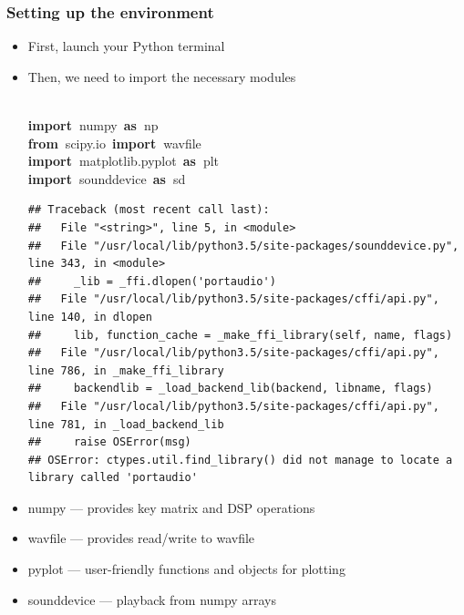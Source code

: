 \documentclass{beamer}\usepackage[]{graphicx}\usepackage[]{color}
\makeatletter
\newcommand{\hlopt}[1]{\textcolor[rgb]{0,0,0}{#1}}%
\newcommand{\hlstd}[1]{\textcolor[rgb]{0.345,0.345,0.345}{#1}}%
\newcommand{\hlkwa}[1]{\textcolor[rgb]{0.161,0.373,0.58}{\textbf{#1}}}%
\newenvironment{kframe}{%
 \def\at@end@of@kframe{}%
 \ifinner\ifhmode%
  \def\at@end@of@kframe{\end{minipage}}%
  \begin{minipage}{\columnwidth}%
 \fi\fi%
 \def\FrameCommand##1{\hskip\@totalleftmargin \hskip-\fboxsep
 \colorbox{shadecolor}{##1}\hskip-\fboxsep
     \hskip-\linewidth \hskip-\@totalleftmargin \hskip\columnwidth}%
 \MakeFramed {\advance\hsize-\width
   \@totalleftmargin\z@ \linewidth\hsize
   \@setminipage}}%
 {\par\unskip\endMakeFramed%
 \at@end@of@kframe}
\newenvironment{knitrout}{}{} %
\makeatother
\begin{document}
\begin{frame}[fragile]
\frametitle{Setting up the environment}
\begin{itemize}
	\item First, launch your Python terminal

	\item Then, we need to import the necessary modules
\begin{knitrout}
\color{fgcolor}\begin{kframe}
\noindent
\ttfamily
\hlstd{}\hspace*{\fill}\\
\hlkwa{import\ }\hlstd{numpy\ }\hlkwa{as\ }\hlstd{np}\hspace*{\fill}\\
\hlkwa{from\ }\hlstd{scipy}\hlopt{.}\hlstd{io\ }\hlkwa{import\ }\hlstd{wavfile}\hspace*{\fill}\\
\hlkwa{import\ }\hlstd{matplotlib}\hlopt{.}\hlstd{pyplot\ }\hlkwa{as\ }\hlstd{plt}\hspace*{\fill}\\
\hlkwa{import\ }\hlstd{sounddevice\ }\hlkwa{as\ }\hlstd{sd}\hspace*{\fill}\\
\hspace*{\fill}
\mbox{}
\normalfont

\begin{verbatim}
## Traceback (most recent call last):
##   File "<string>", line 5, in <module>
##   File "/usr/local/lib/python3.5/site-packages/sounddevice.py", line 343, in <module>
##     _lib = _ffi.dlopen('portaudio')
##   File "/usr/local/lib/python3.5/site-packages/cffi/api.py", line 140, in dlopen
##     lib, function_cache = _make_ffi_library(self, name, flags)
##   File "/usr/local/lib/python3.5/site-packages/cffi/api.py", line 786, in _make_ffi_library
##     backendlib = _load_backend_lib(backend, libname, flags)
##   File "/usr/local/lib/python3.5/site-packages/cffi/api.py", line 781, in _load_backend_lib
##     raise OSError(msg)
## OSError: ctypes.util.find_library() did not manage to locate a library called 'portaudio'
\end{verbatim}
\end{kframe}
\end{knitrout}
\end{itemize}

\begin{itemize}
	\item numpy --- provides key matrix and DSP operations

	\item wavfile --- provides read/write to wavfile
	
	\item pyplot --- user-friendly functions and objects for plotting

	\item sounddevice --- playback from numpy arrays
\end{itemize}
\end{frame}
\end{document}
